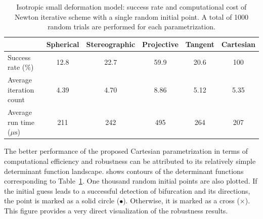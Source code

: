 \documentclass[12pt]{article}
\numberwithin{equation}{section}
\begin{document}
\begin{table}[!htbp]
  \begin{center}
    \begin{tabular}{l | c c c c c}
      \toprule
      & Spherical & Stereographic & Projective & Tangent & Cartesian \\
      \midrule
      Success rate ($\%$)      & 12.8 & 22.7 & 59.9  & 20.6  & 100   \\
      Average iteration count    & 4.39 & 4.70 & 8.86  & 5.12  & 5.35   \\
      Average run time (${\mu\text{s}}$) & 211  & 242  & 495  & 264  & 207 \\
      \bottomrule
    \end{tabular}
    \caption{Isotropic small deformation model: success rate and
      computational cost of Newton iterative scheme with a single
      random initial point. A total of 1000 random trials are
      performed for each parametrization.}
    \label{tab:iso-shear-random-para}
  \end{center}
\end{table}

The better performance of the proposed Cartesian parametrization in
terms of computational efficiency and robustness can be attributed to
its relatively simple determinant function landscape.
 shows contours of the determinant
functions corresponding to Table~\ref{tab:iso-shear-random-para}. One
thousand random initial points are also plotted. If the initial guess
leads to a successful detection of bifurcation and its directions, the
point is marked as a solid circle ($\bullet$). Otherwise, it is marked
as a cross ($\times$). This figure provides a very direct
visualization of the robustness results.
\end{document}
